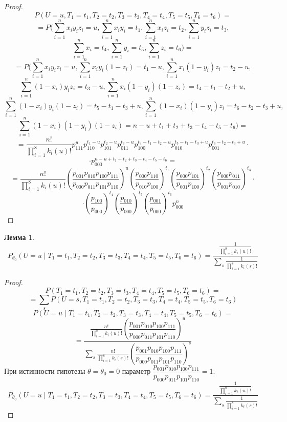 \documentclass[a4paper,14pt]{extarticle}
\theoremstyle{definition}
\newtheorem{lemma}{Лемма}[section]
\begin{document}
\begin{proof}
    $$
        P(U=u, T_1=t_1, T_2=t_2, T_3=t_3, T_4=t_4, T_5=t_5, T_6=t_6)=
    $$
    $$
        =P\biggl(\sum_{i=1}^n x_i y_i z_i=u, \sum_{i=1}^n x_i y_i=t_1, \sum_{i=1}^n x_i z_i=t_2,\sum_{i=1}^n y_i z_i=t_3,
        $$
        $$
        \sum_{i=1}^n x_i=t_4,\sum_{i=1}^n y_i=t_5, \sum_{i=1}^n z_i=t_6\biggr)=
    $$
    $$
        =P\biggl(\sum_{i=1}^n x_i y_i z_i=u, \sum_{i=1}^n x_i y_i (1- z_i)=t_1-u, \sum_{i=1}^n x_i (1-y_i) z_i=t_2-u,
    $$
    $$
        \sum_{i=1}^n (1-x_i) y_i z_i=t_3-u,
        \sum_{i=1}^{n} x_i(1-y_i)(1-z_i)=t_4-t_1-t_2+u,
    $$
    $$
        \sum_{i=1}^{n} (1-x_i)y_i(1-z_i)=t_5-t_1-t_3+u,
        \sum_{i=1}^{n} (1-x_i)(1-y_i)z_i = t_6 - t_2 - t_3 + u,
    $$
    $$
        \sum_{i=1}^n (1-x_i)(1-y_i)(1-z_i)=n-u+t_1+t_2+t_3-t_4-t_5-t_6\biggr)=
    $$
    $$
        = \frac{n!}{\prod_{i=1}^8 k_i(u)!} p_{111}^u p_{110}^{t_1-u} p_{101}^{t_2-u} p_{011}^{t_3-u}
        p_{100}^{t_4-t_1-t_2+u} p_{010}^{t_5-t_1-t_3+u} p_{001}^{t_6 - t_2 - t_3 + u} \cdot
    $$
    $$
        \cdot p_{000}^{n-u+t_1+t_2+t_3-t_4-t_5-t_6}
        =
    $$
    $$=\frac{n!}{\prod_{i=1}^8 k_i(u)!} \left(\dfrac{p_{001}p_{010}p_{100}p_{111}}{p_{000}p_{011}p_{101}p_{110}}\right)^u
        \left(\dfrac{p_{000} p_{110}}{p_{010} p_{100}}\right)^{t_1}\left(\dfrac{p_{000}p_{101}}{p_{001}p_{100}}\right)^{t_2}
        \left(\dfrac{p_{000}p_{011}}{p_{001}p_{010}}\right)^{t_3} \cdot$$
    $$
        \cdot\left(\dfrac{p_{100}}{p_{000}}\right)^{t_4}
        \left(\dfrac{p_{010}}{p_{000}}\right)^{t_5} \left(\dfrac{p_{001}}{p_{000}}\right)^{t_6} p_{000}^n
    $$
\end{proof}

\begin{lemma}
    $$P_{\theta_0}(U=u \mid T_1=t_1, T_2=t_2, T_3=t_3, T_4=t_4, T_5=t_5, T_6=t_6)=\dfrac{\frac{1}{\prod_{i=1}^8 k_i(u)!}}
        {\sum_{s} \frac{1}{\prod_{i=1}^8 k_i(s)!}}$$
\end{lemma}
\begin{proof}
    $$P(T_1=t_1, T_2=t_2, T_3=t_3, T_4=t_4, T_5=t_5, T_6=t_6)=$$
    $$=\sum_{s} P(U=s, T_1=t_1, T_2=t_2, T_3=t_3, T_4=t_4, T_5=t_5, T_6=t_6)$$
    $$P(U=u \mid T_1=t_1, T_2=t_2, T_3=t_3, T_4=t_4, T_5=t_5, T_6=t_6)=$$
    $$=\dfrac{\frac{n!}{\prod_{i=1}^8 k_i(u)!} \left(\dfrac{p_{001}p_{010}p_{100}p_{111}}{p_{000}p_{011}p_{101}p_{110}}\right)^u}
        {\sum_{s} \frac{n!}{\prod_{i=1}^8 k_i(s)!} \left(\dfrac{p_{001}p_{010}p_{100}p_{111}}{p_{000}p_{011}p_{101}p_{110}}\right)^s}$$
    При истинности гипотезы $\theta=\theta_0=0$ параметр $\dfrac{p_{001}p_{010}p_{100}p_{111}}{p_{000}p_{011}p_{101}p_{110}}=1$.
    $$P_{\theta_0}(U=u \mid T_1=t_1, T_2=t_2, T_3=t_3, T_4=t_4, T_5=t_5, T_6=t_6)=\dfrac{\frac{1}{\prod_{i=1}^8 k_i(u)!}}
        {\sum_{s} \frac{1}{\prod_{i=1}^8 k_i(s)!}}$$
\end{proof}
\end{document}
